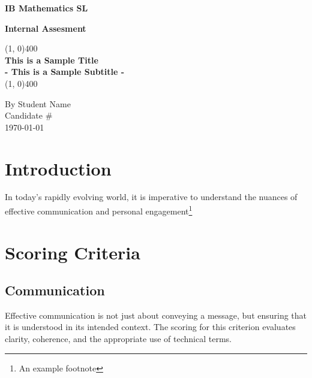 \documentclass[11pt]{article}
\begin{document}
\begin{titlepage}

\begin{center}

\vspace*{1cm} %

\Large{\textbf{IB Mathematics SL}}

\Large{\textbf{Internal Assesment}}

\vfill
\line(1, 0){400} \\[1mm] %
\huge{\textbf{This is a Sample Title}} \\[1mm]
\large{\textbf{- This is a Sample Subtitle -}} \\[1mm]
\line(1, 0){400}
\vfill

By Student Name \\
Candidate \# \\
\today \\

\end{center}

\end{titlepage}

\tableofcontents  %
\thispagestyle{empty} %
\clearpage %

\setcounter{page}{1} %

\section{Introduction}

In today's rapidly evolving world, it is imperative to understand the nuances of effective communication and personal engagement\footnote{An example footnote}

\section{Scoring Criteria}

\subsection{Communication}

Effective communication is not just about conveying a message, but ensuring that it is understood in its intended context. The scoring for this criterion evaluates clarity, coherence, and the appropriate use of technical terms. 
\end{document}
